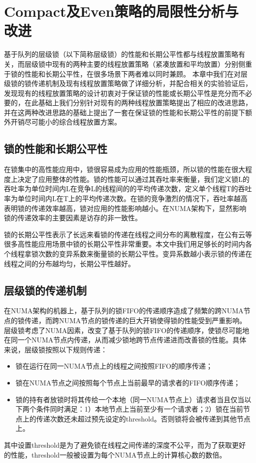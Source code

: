 \chapter{Compact及Even策略的局限性分析与改进}
\label{chap:example}
基于队列的层级锁（以下简称层级锁）的性能和长期公平性都与线程放置策略有关，而层级锁中现有的两种主要的线程放置策略（紧凑放置和平均放置）分别侧重于锁的性能和长期公平性，在很多场景下两者难以同时兼顾。
本章中我们在对层级锁的锁传递机制及现有线程放置策略做了详细分析，并配合相关的实验验证后，发现现有的线程放置策略的设计初衷对于保证锁的性能或长期公平性是充分而不必要的，在此基础上我们分别针对现有的两种线程放置策略提出了相应的改进思路，并在这两种改进思路的基础上提出了一套在保证锁的性能和长期公平性的前提下额外开销尽可能小的综合线程放置方案。


\section{锁的性能和长期公平性}
在锁集中的高性能应用中，锁很容易成为应用的性能瓶颈，所以锁的性能在很大程度上决定了应用整体的性能\cite{johnson2010decoupling}。锁的性能可以通过其吞吐率来衡量，我们定义锁L的吞吐率为单位时间内L在竞争L的线程间的的平均传递次数，定义单个线程T的吞吐率为单位时间内L在T上的平均传递次数。在锁的竞争激烈的情况下，吞吐率越高表明锁的传递效率越高，锁对应用的性能影响越小。在NUMA架构下，显然影响锁的传递效率的主要因素是访存的非一致性。

锁的长期公平性表示了长远来看锁的传递在线程之间分布的离散程度，在公有云等很多高性能应用场景中锁的长期公平性非常重要。本文中我们用足够长的时间内各个线程拿锁次数的变异系数来衡量锁的长期公平性。变异系数越小表示锁的传递在线程之间的分布越均匀，长期公平性越好。

\section{层级锁的传递机制}
在NUMA架构的机器上，基于队列的锁FIFO的传递顺序造成了频繁的跨NUMA节点的锁传递，而跨NUMA节点的锁传递的巨大开销使得锁的性能受到严重影响。层级锁考虑了NUMA因素，改变了基于队列的锁FIFO的传递顺序，使锁尽可能地在同一个NUMA节点内传递，从而减少锁地跨节点传递进而改善锁的性能。具体来说，层级锁按照以下规则传递：
\begin{itemize}
\item 锁在运行在同一NUMA节点上的线程之间按照FIFO的顺序传递；
\item 锁在NUMA节点之间按照每个节点上当前最早的请求者的FIFO顺序传递；
\item 锁的持有者放锁时将其传给一个本地（同一NUMA节点上）请求者当且仅当以下两个条件同时满足：1）本地节点上当前至少有一个请求者；2）锁在当前节点上的传递次数还未超过预先设定的threshold。否则锁将会被传递到其他节点上。
\end{itemize}
其中设置threshold是为了避免锁在线程之间传递的深度不公平，而为了获取更好的性能，threshold一般被设置为每个NUMA节点上的计算核心数的数倍。

